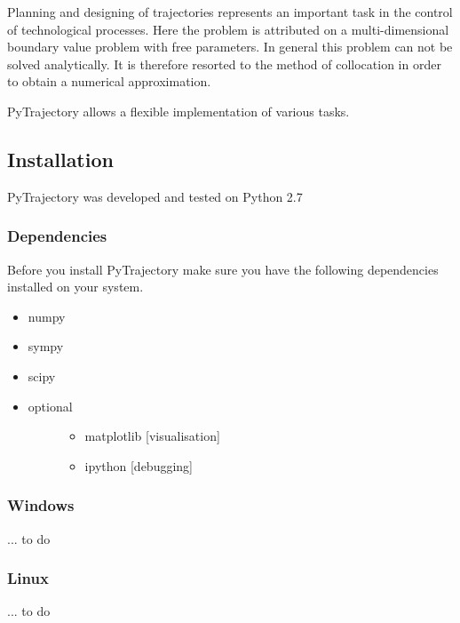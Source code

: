 \documentclass[letterpaper,10pt,english]{sphinxmanual}
\begin{document}
Planning and designing of trajectories represents an important task in
the control of technological processes. Here the problem is attributed
on a multi-dimensional boundary value problem with free parameters.
In general this problem can not be solved analytically. It is therefore
resorted to the method of collocation in order to obtain a numerical
approximation.

PyTrajectory allows a flexible implementation of various tasks.


\subsection{Installation}
\label{guide/start:installation}
PyTrajectory was developed and tested on Python 2.7


\subsubsection{Dependencies}
\label{guide/start:dependencies}
Before you install PyTrajectory make sure you have the following
dependencies installed on your system.
\begin{itemize}
\item {} 
numpy

\item {} 
sympy

\item {} 
scipy

\item {} \begin{description}
\item[{optional}] \leavevmode\begin{itemize}
\item {} 
matplotlib {[}visualisation{]}

\item {} 
ipython {[}debugging{]}

\end{itemize}

\end{description}

\end{itemize}


\subsubsection{Windows}
\label{guide/start:windows}
... to do


\subsubsection{Linux}
\label{guide/start:linux}
... to do
\end{document}
